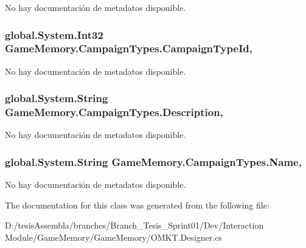 No hay documentación de metadatos disponible. 

\hypertarget{class_game_memory_1_1_campaign_types_ab534e8f9389bed7b5d6ecb86a17518b8}{
\subsubsection[{Campaign\-Type\-Id}]{\setlength{\rightskip}{0pt plus 5cm}global.\-System.\-Int32 Game\-Memory.\-Campaign\-Types.\-Campaign\-Type\-Id\hspace{0.3cm}{\ttfamily [get]}, {\ttfamily [set]}}}\label{class_game_memory_1_1_campaign_types_ab534e8f9389bed7b5d6ecb86a17518b8}


No hay documentación de metadatos disponible. 

\hypertarget{class_game_memory_1_1_campaign_types_a10d33d848dc2aaefd8e83d501579e172}{
\subsubsection[{Description}]{\setlength{\rightskip}{0pt plus 5cm}global.\-System.\-String Game\-Memory.\-Campaign\-Types.\-Description\hspace{0.3cm}{\ttfamily [get]}, {\ttfamily [set]}}}\label{class_game_memory_1_1_campaign_types_a10d33d848dc2aaefd8e83d501579e172}


No hay documentación de metadatos disponible. 

\hypertarget{class_game_memory_1_1_campaign_types_a24dabf7fdd3c80cd369958be0e7b846d}{
\subsubsection[{Name}]{\setlength{\rightskip}{0pt plus 5cm}global.\-System.\-String Game\-Memory.\-Campaign\-Types.\-Name\hspace{0.3cm}{\ttfamily [get]}, {\ttfamily [set]}}}\label{class_game_memory_1_1_campaign_types_a24dabf7fdd3c80cd369958be0e7b846d}


No hay documentación de metadatos disponible. 



The documentation for this class was generated from the following file\-:\begin{DoxyCompactItemize}
\item 
D\-:/tesis\-Assembla/branches/\-Branch\-\_\-\-Tesis\-\_\-\-Sprint01/\-Dev/\-Interaction Module/\-Game\-Memory/\-Game\-Memory/O\-M\-K\-T.\-Designer.\-cs\end{DoxyCompactItemize}
